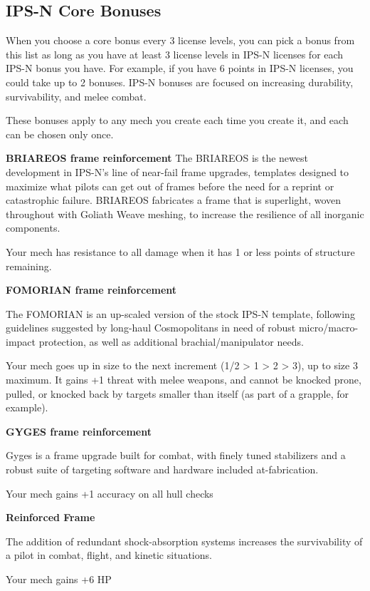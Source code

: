 \subsection{IPS-N Core Bonuses}

When you choose a core bonus every 3 license levels, you can pick a bonus from this list as long as you have at least 3 license levels in IPS-N licenses for each IPS-N bonus you have. For example, if you have 6 points in IPS-N licenses, you could take up to 2 bonuses. IPS-N bonuses are focused on increasing durability, survivability, and melee combat.

These bonuses apply to any mech you create each time you create it, and each can be chosen only once.


\textbf{BRIAREOS frame reinforcement}
The BRIAREOS is the newest development in IPS-N's line of near-fail frame upgrades, templates designed to maximize what pilots can get out of frames before the need for a reprint or catastrophic failure. BRIAREOS fabricates a frame that is superlight, woven throughout with Goliath Weave meshing, to increase the resilience of all inorganic components.

Your mech has resistance to all damage when it has 1 or less points of structure remaining.


\textbf{FOMORIAN frame reinforcement}

The FOMORIAN is an up-scaled version of the stock IPS-N template, following guidelines suggested by long-haul Cosmopolitans in need of robust micro/macro-impact protection, as well as additional brachial/manipulator needs.

Your mech goes up in size to the next increment (1/2 > 1 > 2 > 3), up to size 3 maximum. It gains +1 threat with melee weapons, and cannot be knocked prone, pulled, or knocked back by targets smaller than itself (as part of a grapple, for example).


\textbf{GYGES frame reinforcement}

Gyges is a frame upgrade built for combat, with finely tuned stabilizers and a robust suite of targeting software and hardware included at-fabrication.

Your mech gains +1 accuracy on all hull checks


\textbf{Reinforced Frame}

The addition of redundant shock-absorption systems increases the survivability of a pilot in combat, flight, and kinetic situations.

Your mech gains +6 HP


